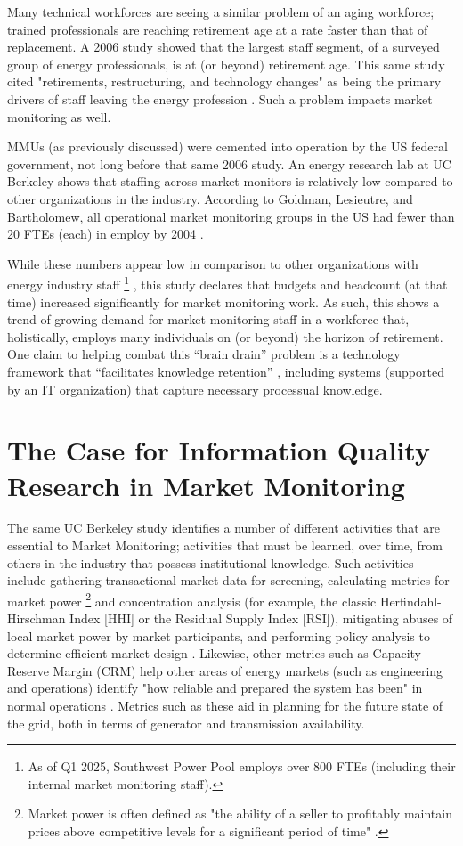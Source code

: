 Many technical workforces are seeing a similar problem of an aging workforce; trained professionals are reaching retirement age at a rate faster than that of replacement. A 2006 study showed that the largest staff segment, of a surveyed group of energy professionals, is at (or beyond) retirement age. This same study cited "retirements, restructuring, and technology changes" as being the primary drivers of staff leaving the energy profession \cite{raysnyder}. Such a problem impacts market monitoring as well.

MMUs (as previously discussed) were cemented into operation by the US federal government, not long before that same 2006 study. An energy research lab at UC Berkeley shows that staffing across market monitors is relatively low compared to other organizations in the industry. According to Goldman, Lesieutre, and Bartholomew, all operational market monitoring groups in the US had fewer than 20 FTEs (each) in employ by 2004 \cite{goldman}.

While these numbers appear low in comparison to other organizations with energy industry staff \footnote{As of Q1 2025, Southwest Power Pool employs over 800 FTEs (including their internal market monitoring staff).}
, this study declares that budgets and headcount (at that time) increased significantly for market monitoring work. As such, this shows a trend of growing demand for market monitoring staff in a workforce that, holistically, employs many individuals on (or beyond) the horizon of retirement. One claim to helping combat this “brain drain” problem is a technology framework that “facilitates knowledge retention” \cite{raysnyder}, including systems (supported by an IT organization) that capture necessary processual knowledge.

\section{The Case for Information Quality Research in Market Monitoring}

The same UC Berkeley study identifies a number of different activities that are essential to Market Monitoring; activities that must be learned, over time, from others in the industry that possess institutional knowledge. Such activities include gathering transactional market data for screening, calculating metrics for market power \footnote{Market power is often defined as "the ability of a seller to profitably maintain prices above competitive levels for a significant period of time" \cite{rahimi-sheffrin}.}
and concentration analysis (for example, the classic Herfindahl-Hirschman Index [HHI] or the Residual Supply Index [RSI]), mitigating abuses of local market power by market participants, and performing policy analysis to determine efficient market design \cite{goldman} \cite{gao-bompard-napoli-zhou}. Likewise, other metrics such as Capacity Reserve Margin (CRM) help other areas of energy markets (such as engineering and operations) identify "how reliable and prepared the system has been" in normal operations \cite{jyang}. Metrics such as these aid in planning for the future state of the grid, both in terms of generator and transmission availability.

